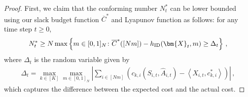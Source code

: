 \documentclass{article}
\theoremstyle{plain}
\theoremstyle{remark}
\newcommand{\abs}[1]{\left\lvert#1\right\rvert}
\newcommand{\maxk}{\max_{k\in[K]}}
\newcommand{\ID}{\textnormal{ID}}
\newcommand{\rembud}{\overline{C}^*} %
\def\mX{{\bm{X}}}
\newcommand{\innerproduct}[2]{\left\langle #1, #2 \right\rangle}
\newcommand{\bracket}[1]{\left(#1\right)}
\newcommand{\sets}[1]{\left\{ #1 \right\}}
\begin{document}
\begin{proof}
First, we claim that the conforming number $N_t^*$ can be lower bounded using our slack budget function $\rembud$ and Lyapunov function as follows: for any time step $t\geq 0$, 
\begin{align}\label{eq:nt eq1}
    N_t^* \geq N \max\sets{m\in[0,1]_N\colon   \rembud([Nm])-h_{\ID}(\mX_t,m)\geq  \Delta_t}\,,
\end{align}
where $\Delta_t$ is the random variable given by 
\begin{align}\label{eq:deltat}
    \Delta_t = \maxk \max_{m\in[0,1]_N} \abs{\sum_{i\in[Nm]}\bracket{c_{k,i}(S_{i,t},\widehat{A}_{i,t})- \innerproduct{X_{i,t}}{c_{k,i}^*}}}\,,
\end{align}
which captures the difference between the expected cost and the actual cost.  


\end{proof}
\end{document}
